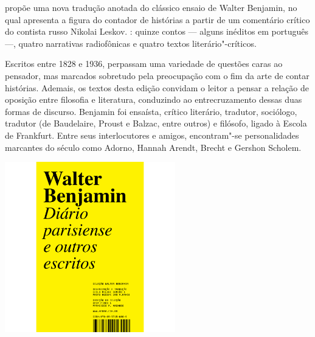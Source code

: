\medskip

 propõe uma nova tradução anotada do clássico ensaio de Walter Benjamin, no qual apresenta a figura do contador de histórias a partir de um comentário crítico do contista russo Nikolai Leskov. : quinze contos --- alguns inéditos em português ---, quatro narrativas radiofônicas e quatro textos literário"-críticos.

Escritos entre 1828 e 1936, perpassam uma variedade de questões caras ao pensador, mas marcados sobretudo pela preocupação com o fim da arte de contar histórias. Ademais, os textos desta edição convidam o leitor a pensar a relação de oposição entre filosofia e literatura, conduzindo ao entrecruzamento dessas duas formas de discurso. Benjamin foi ensaísta, crítico literário, tradutor, sociólogo, tradutor (de Baudelaire, Proust e Balzac, entre outros) e filósofo, ligado à Escola de Frankfurt. Entre seus interlocutores e amigos, encontram"-se personalidades marcantes do século  como Adorno, Hannah Arendt, Brecht e Gershon Scholem.


\vfill

\hspace*{-.4cm}\begin{minipage}[c]{.6\linewidth}
\small{
{}}
\end{minipage}


\pagebreak

\begin{center}
\hspace*{.5cm}\includegraphics[width=74mm]{./grid/benjamin2.jpg}
\end{center}


